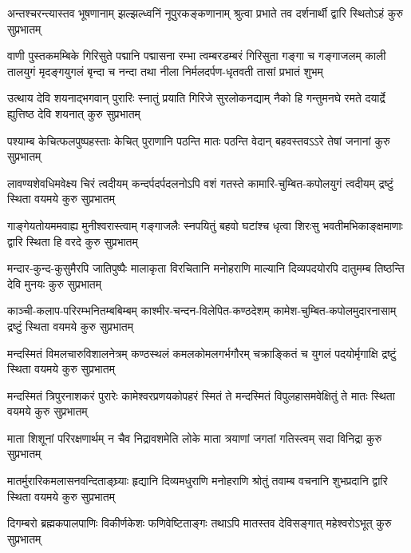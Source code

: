 \fourlineindentedshloka
{अन्तश्चरन्त्यास्तव भूषणानाम्}
{झल्झल्ध्वनिं नूपुरकङ्कणानाम्}
{श्रुत्वा प्रभाते तव दर्शनार्थी}
{द्वारि स्थितोऽहं कुरु सुप्रभातम्}

\fourlineindentedshloka
{वाणी पुस्तकमम्बिके गिरिसुते पद्मानि पद्मासना}
{रम्भा त्वम्बरडम्बरं गिरिसुता गङ्गा च गङ्गाजलम्}
{काली तालयुगं मृदङ्गयुगलं बृन्दा च नन्दा तथा}
{नीला निर्मलदर्पण-धृतवती तासां प्रभातं शुभम्}

\fourlineindentedshloka
{उत्थाय देवि शयनाद्भगवान् पुरारिः}
{स्नातुं प्रयाति गिरिजे सुरलोकनद्याम्}
{नैको हि गन्तुमनघे रमते दयार्द्रे}
{ह्युत्तिष्ठ देवि शयनात् कुरु सुप्रभातम्}

\fourlineindentedshloka
{पश्याम्ब केचित्फलपुष्पहस्ताः}
{केचित् पुराणानि पठन्ति मातः}
{पठन्ति वेदान् बहवस्तवऽऽरे}
{तेषां जनानां कुरु सुप्रभातम्}

\fourlineindentedshloka
{लावण्यशेवधिमवेक्ष्य चिरं त्वदीयम्}
{कन्दर्पदर्पदलनोऽपि वशं गतस्ते}
{कामारि-चुम्बित-कपोलयुगं त्वदीयम्}
{द्रष्टुं स्थिता वयमये कुरु सुप्रभातम्}

\fourlineindentedshloka
{गाङ्गेयतोयममवाह्य मुनीश्वरास्त्वाम्}
{गङ्गाजलैः स्नपयितुं बहवो घटांश्च}
{धृत्वा शिरःसु भवतीमभिकाङ्क्षमाणाः}
{द्वारि स्थिता हि वरदे कुरु सुप्रभातम्}

\fourlineindentedshloka
{मन्दार-कुन्द-कुसुमैरपि जातिपुष्पैः}
{मालाकृता विरचितानि मनोहराणि}
{माल्यानि दिव्यपदयोरपि दातुमम्ब}
{तिष्ठन्ति देवि मुनयः कुरु सुप्रभातम्}

\fourlineindentedshloka
{काञ्ची-कलाप-परिरम्भनितम्बबिम्बम्}
{काश्मीर-चन्दन-विलेपित-कण्ठदेशम्}
{कामेश-चुम्बित-कपोलमुदारनासाम्}
{द्रष्टुं स्थिता वयमये कुरु सुप्रभातम्}

\fourlineindentedshloka
{मन्दस्मितं विमलचारुविशालनेत्रम्}
{कण्ठस्थलं कमलकोमलगर्भगौरम्}
{चक्राङ्कितं च युगलं पदयोर्मृगाक्षि}
{द्रष्टुं स्थिता वयमये कुरु सुप्रभातम्}

\fourlineindentedshloka
{मन्दस्मितं त्रिपुरनाशकरं पुरारेः}
{कामेश्वरप्रणयकोपहरं स्मितं ते}
{मन्दस्मितं विपुलहासमवेक्षितुं ते}
{मातः स्थिता वयमये कुरु सुप्रभातम्}

\fourlineindentedshloka
{माता शिशूनां परिरक्षणार्थम्}
{न चैव निद्रावशमेति लोके}
{माता त्रयाणां जगतां गतिस्त्वम्}
{सदा विनिद्रा कुरु सुप्रभातम्}

\fourlineindentedshloka
{मातर्मुरारिकमलासनवन्दिताङ्घ्र्याः}
{हृद्यानि दिव्यमधुराणि मनोहराणि}
{श्रोतुं तवाम्ब वचनानि शुभप्रदानि}
{द्वारि स्थिता वयमये कुरु सुप्रभातम्}

\fourlineindentedshloka
{दिगम्बरो ब्रह्मकपालपाणिः}
{विकीर्णकेशः फणिवेष्टिताङ्गः}
{तथाऽपि मातस्तव देविसङ्गात्}
{महेश्वरोऽभूत् कुरु सुप्रभातम्}

